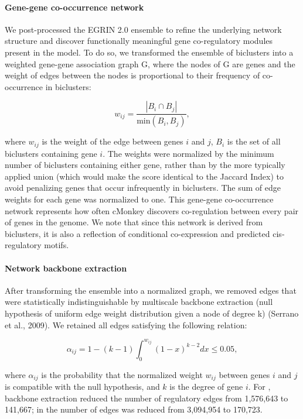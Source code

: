 \paragraph{Gene-gene co-occurrence network}

We post-processed the EGRIN 2.0 ensemble to refine the underlying
network structure and discover functionally meaningful gene
co-regulatory modules present in the model. To do so, we transformed
the ensemble of biclusters into a weighted gene-gene association graph
G, where the nodes of G are genes and the weight of edges between the
nodes is proportional to their frequency of co-occurrence in
biclusters:

\begin{equation}
w_{ij} = \frac{\left|B_i\cap B_j\right|}{\mathrm{min}(B_i,B_j)},
\end{equation}

\noindent where $w_{ij}$ is the weight of the edge between genes $i$ and $j$,
$B_i$ is the set of all biclusters containing gene $i$. The weights
were normalized by the minimum number of biclusters containing either
gene, rather than by the more typically applied union (which would
make the score identical to the Jaccard Index) to avoid penalizing
genes that occur infrequently in biclusters. The sum of edge weights
for each gene was normalized to one. This gene-gene co-occurrence
network represents how often cMonkey discovers co-regulation between
every pair of genes in the genome. We note that since this network is
derived from biclusters, it is also a reflection of conditional
co-expression and predicted cis­regulatory motifs.

\paragraph{Network backbone extraction}

After transforming the ensemble into a normalized graph, we removed
edges that were statistically indistinguishable by multiscale backbone
extraction (null hypothesis of uniform edge weight distribution given
a node of degree k) (Serrano et al., 2009). We retained all edges
satisfying the following relation:

\begin{equation}
\alpha_{ij}=1-(k-1)\int_0^{w_{ij}}(1-x)^{k-2}dx\leq 0.05,
\end{equation}

\noindent where $\alpha_{ij}$ is the probability that the normalized weight $w_{ij}$ between
genes $i$ and $j$ is compatible with the null hypothesis, and $k$ is the
degree of gene $i$. For \halo, backbone extraction reduced the
number of regulatory edges from 1,576,643 to 141,667; in \eco the
number of edges was reduced from 3,094,954 to 170,723.

